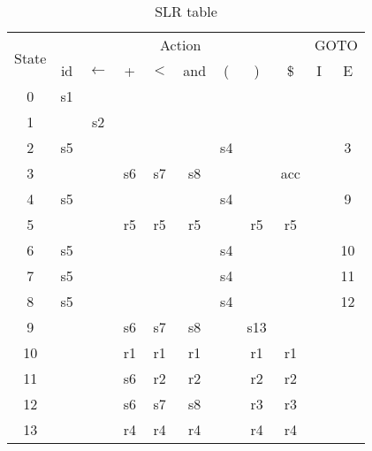 \begin{table}[!ht]
  \centering
  \begin{tabular}{|c||c|c|c|c|c|c|c|c||c|c|}
    \hline
    \multirow{2}{*}{State} & \multicolumn{8}{c||}{Action} & \multicolumn{2}{c|}{GOTO}\\
    \cline{2-11} & id & $\leftarrow$ & + & $<$ & and & ( & ) &\$ & I & E\\
    \hline
    0  &s1 &   &   &   &   &   &   &   &   &\\
    \hline
    1  &   &s2 &   &   &   &   &   &   &   &\\
    \hline
    2  &s5 &   &   &   &   &s4 &   &   &   &3\\
    \hline
    3  &   &   &s6 &s7 &s8 &   &   &acc&   &\\
    \hline
    4  &s5 &   &   &   &   &s4 &   &   &   &9\\
    \hline
    5  &   &   &r5 &r5 &r5 &   &r5 &r5 &   &\\
    \hline
    6   &s5 &   &   &   &   &s4 &   &   &   &10\\
    \hline
    7   &s5 &   &   &   &   &s4 &   &   &   &11\\
    \hline
    8   &s5 &   &   &   &   &s4 &   &   &   &12\\
    \hline
    9   &   &   &s6 &s7 &s8 &   &s13&   &   &\\
    \hline
    10  &   &   &r1 &r1 &r1 &   &r1 &r1 &   &\\
    \hline
    11  &   &   &s6 &r2 &r2 &   &r2 &r2 &   &\\
    \hline
    12  &   &   &s6 &s7 &s8 &   &r3 &r3 &   &\\
    \hline
    13  &   &   &r4 &r4 &r4 &   &r4 &r4 &   &\\
    \hline
  \end{tabular}
  \caption{SLR table}
\end{table}
